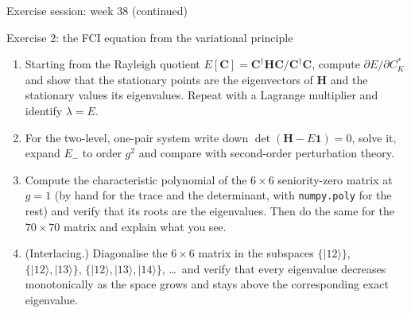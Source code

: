 \documentclass[aspectratio=169,10pt]{beamer}
\newcommand{\ket}[1]{\vert #1\rangle}
\begin{document}
\begin{frame}{Exercise session: week 38 (continued)}
  \footnotesize
  \begin{block}{Exercise 2: the FCI equation from the variational principle}
    \begin{enumerate}
      \item[a)] Starting from the Rayleigh quotient $E[\bm{C}]=\bm{C}^{\dagger}\bm{H}\bm{C}/\bm{C}^{\dagger}\bm{C}$, compute $\partial E/\partial C_K^{*}$ and show that the stationary points are the eigenvectors of $\bm{H}$ and the stationary values its eigenvalues. Repeat with a Lagrange multiplier and identify $\lambda=E$.
      \item[b)] For the two-level, one-pair system write down $\det(\bm{H}-E\bm{1})=0$, solve it, expand $E_-$ to order $g^2$ and compare with second-order perturbation theory.
      \item[c)] Compute the characteristic polynomial of the $6\times6$ seniority-zero matrix at $g=1$ (by hand for the trace and the determinant, with \texttt{numpy.poly} for the rest) and verify that its roots are the eigenvalues. Then do the same for the $70\times70$ matrix and explain what you see.
      \item[d)] (Interlacing.) Diagonalise the $6\times6$ matrix in the subspaces $\{\ket{12}\}$, $\{\ket{12},\ket{13}\}$, $\{\ket{12},\ket{13},\ket{14}\}$, \dots\ and verify that every eigenvalue decreases monotonically as the space grows and stays above the corresponding exact eigenvalue.
    \end{enumerate}
  \end{block}
\end{frame}
\end{document}
